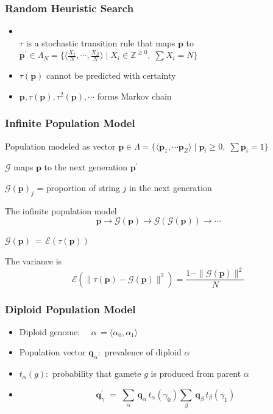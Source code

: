 \documentclass[aspectratio=169]{beamer}
\begin{document}
  \begin{frame}
    \frametitle{ Random Heuristic Search}
    {
    \begin{itemize}    
      \item{ \mbox{}\\[-0.5in] $\tau$ is a stochastic transition rule that maps 
      $\bm{p}$ to $\bm{p^\prime} \in \Lambda_N = \{\langle \frac{X_1}{N},\cdots,\frac{X_Z}{N} \rangle \;|\; X_i \in \mathbb{Z}^{\geq 0},\; \sum X_i = N\}$}
      \item{$\tau(\bm{p})$ cannot be predicted with certainty }  
      \item{$\bm{p}, \tau(\bm{p}), \tau^2(\bm{p}), \cdots $ forms Markov chain}                
    \end{itemize}
    }
  \end{frame}
  
  \begin{frame}
    \frametitle{Infinite Population Model}
    \begin{itemize}
      \item{Population modeled as vector $\bm{p} \in \Lambda = \{\langle \bm{p}_1, \cdots \bm{p}_Z \rangle \;|\; \bm{p}_i \geq 0,\; \sum \bm{p}_i = 1 \}$}
      \item{$\mathcal{G}$ maps $\bm{p}$ to the next generation $\bm{p}^\prime$}
      \item{$\mathcal{G}(\bm{p})_j$ =  proportion of string $j$ in the next generation}
      {
      \item{The infinite population model 
	\[\bm{p} \to \mathcal{G}(\bm{p}) \to  {\mathcal{G}}(\mathcal{G}(\bm{p})) \to \cdots \]}	
      \item{$\mathcal{G}(\bm{p}) \,=\, \mathcal{E}( \tau (\bm{p}))$}
      }
      \item{The variance is
	\[\mathcal{E}(\| \tau (\bm{p}) - \mathcal{G}(\bm{p}) \|^2) = \frac{1 - \|\mathcal{G}(\bm{p})\|^2}{N}\]
      }
    \end{itemize}  
  \end{frame}   
  
  \begin{frame}
    \frametitle{ Diploid Population Model}
    \begin{itemize}
      \item{Diploid genome: $\quad \alpha \,= \langle \alpha_0, \alpha_1 \rangle$}
      \item{Population vector $\bm{q}_\alpha :$ prevalence of diploid $\alpha$}
      \item{$t_\alpha(g) :$ probability that gamete $g$ is produced from parent $\alpha$ }
      \item{\[\bm{q}_\gamma^{\prime} \; = \;
      \sum_{\alpha} \, \bm{q}_\alpha \, t_\alpha(\gamma_0) 
      \sum_{\beta} \,\bm{q}_\beta \, t_\beta(\gamma_1)\]}
    \end{itemize}
  \end{frame}
  
\end{document}
